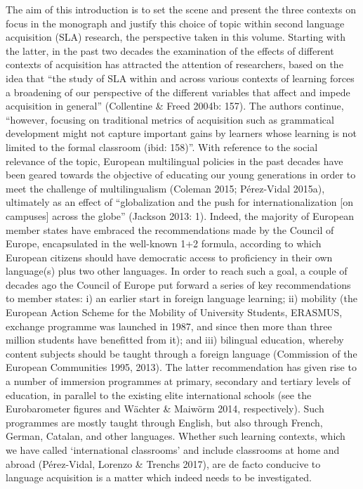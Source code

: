 \documentclass[12pt]{article}
\newenvironment{styleStandard}{\setlength\leftskip{0cm}\setlength\rightskip{0cm plus 1fil}\setlength\parindent{0cm}\setlength\parfillskip{0pt plus 1fil}\setlength\parskip{0in plus 1pt}\writerlistparindent\writerlistleftskip\leavevmode\normalfont\normalsize\writerlistlabel\ignorespaces}{\unskip\vspace{0.111in plus 0.0111in}\par}
\newcommand\writerlistleftskip{}
\newcommand\writerlistparindent{}
\newcommand\writerlistlabel{}
\begin{document}
\begin{styleStandard}
The aim of this introduction is to set the scene and present the three contexts on focus in the monograph and justify this choice of topic within second language acquisition (SLA) research, the perspective taken in this volume. Starting with the latter, in the past two decades the examination of the effects of different contexts of acquisition has attracted the attention of researchers, based on the idea that “the study of SLA within and across various contexts of learning forces a broadening of our perspective of the different variables that affect and impede acquisition in general” (Collentine \& Freed 2004b: 157). The authors continue, “however, focusing on traditional metrics of acquisition such as grammatical development might not capture important gains by learners whose learning is not limited to the formal classroom (ibid: 158)”. With reference to the social relevance of the topic, European multilingual policies in the past decades have been geared towards the objective of educating our young generations in order to meet the challenge of multilingualism (Coleman 2015; Pérez-Vidal 2015a), ultimately as an effect of “globalization and the push for internationalization [on campuses] across the globe” (Jackson 2013: 1). Indeed, the majority of European member states have embraced the recommendations made by the Council of Europe, encapsulated in the well-known 1+2 formula, according to which European citizens should have democratic access to proficiency in their own language(s) plus two other languages. In order to reach such a goal, a couple of decades ago the Council of Europe put forward a series of key recommendations to member states: i) an earlier start in foreign language learning; ii) mobility (the European Action Scheme for the Mobility of University Students, ERASMUS, exchange programme was launched in 1987, and since then more than three million students have benefitted from it); and iii) bilingual education, whereby content subjects should be taught through a foreign language (Commission of the European Communities 1995, 2013). The latter recommendation has given rise to a number of immersion programmes at primary, secondary and tertiary levels of education, in parallel to the existing elite international schools (see the Eurobarometer figures and Wächter \& Maiwörm 2014, respectively). Such programmes are mostly taught through English, but also through French, German, Catalan, and other languages. Whether such learning contexts, which we have called ‘international classrooms’ and include classrooms at home and abroad (Pérez-Vidal, Lorenzo \& Trenchs 2017), are de facto conducive to language acquisition is a matter which indeed needs to be investigated. 
\end{styleStandard}
\end{document}
